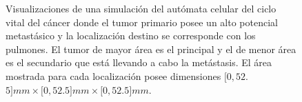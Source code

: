 \begin{figure}[p]
\begin{center}
    
    
    \end{center}\vspace*{-0.6cm}
    \caption[Visualizaciones de una simulaci\'on del aut\'omata celular del ciclo vital del c\'ancer donde el tumor primario posee un alto potencial metast\'asico]{Visualizaciones de una simulaci\'on del aut\'omata celular del ciclo vital del c\'ancer donde el tumor primario posee un alto potencial metast\'asico y la localizaci\'on destino se corresponde con los pulmones. El tumor de mayor \'area es el principal y el de menor \'area es el secundario que est\'a llevando a cabo la met\'astasis. El \'area mostrada para cada localizaci\'on posee dimensiones $[0,52$.$5]mm \times [0,52$.$5]mm \times [0,52$.$5]mm$.}
    \label{fig-full-automata}
    \end{figure}